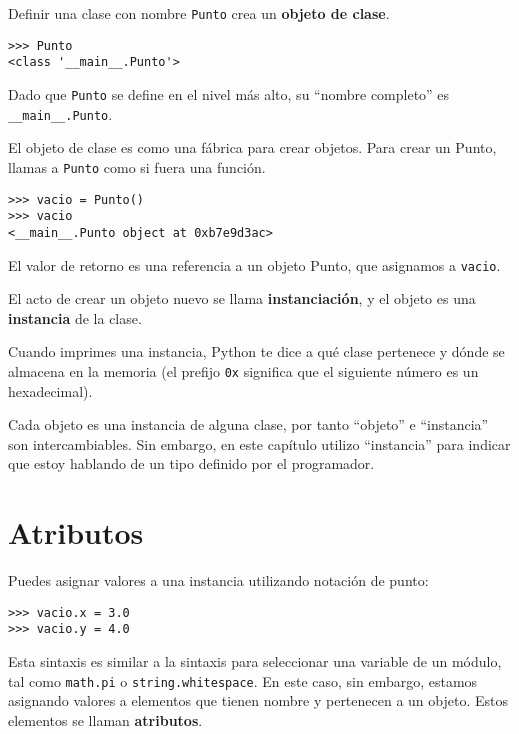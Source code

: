 \documentclass[10pt]{book}
\begin{document}
Definir una clase con nombre {\tt Punto} crea un {\bf objeto de clase}.

\begin{verbatim}
>>> Punto
<class '__main__.Punto'>
\end{verbatim}
%
Dado que {\tt Punto} se define en el nivel más alto, su ``nombre
completo'' es \verb"__main__.Punto".

El objeto de clase es como una fábrica para crear objetos.  Para crear un
Punto, llamas a {\tt Punto} como si fuera una función.

\begin{verbatim}
>>> vacio = Punto()
>>> vacio
<__main__.Punto object at 0xb7e9d3ac>
\end{verbatim}
%
El valor de retorno es una referencia a un objeto Punto, que
asignamos a {\tt vacio}.

El acto de crear un objeto nuevo se llama
{\bf instanciación}, y el objeto es una {\bf instancia} de
la clase.

Cuando imprimes una instancia, Python te dice a qué clase
pertenece y dónde se almacena en la memoria (el prefijo
{\tt 0x} significa que el siguiente número es un hexadecimal).

Cada objeto es una instancia de alguna clase, por tanto ``objeto'' e
``instancia'' son intercambiables.  Sin embargo, en este capítulo utilizo
``instancia'' para indicar que estoy hablando de un tipo definido por el
programador.


\section{Atributos}
\label{attributes}

Puedes asignar valores a una instancia utilizando notación de punto:

\begin{verbatim}
>>> vacio.x = 3.0
>>> vacio.y = 4.0
\end{verbatim}
%
Esta sintaxis es similar a la sintaxis para seleccionar una variable de un
módulo, tal como {\tt math.pi} o {\tt string.whitespace}.  En este caso,
sin embargo, estamos asignando valores a elementos que tienen nombre y pertenecen a un objeto.
Estos elementos se llaman {\bf atributos}.

\end{document}
